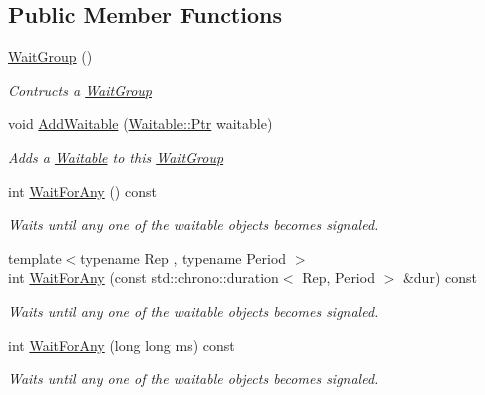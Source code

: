 \subsection*{Public Member Functions}
\begin{DoxyCompactItemize}
\item 
\mbox{\hyperlink{class_command_lib_1_1_wait_group_a813fba9c0d92994c177eee9e6289dc74}{Wait\+Group}} ()
\begin{DoxyCompactList}\small\item\em Contructs a \mbox{\hyperlink{class_command_lib_1_1_wait_group}{Wait\+Group}}\end{DoxyCompactList}\item 
void \mbox{\hyperlink{class_command_lib_1_1_wait_group_a2ad37bdf4b472ad67c660ceb2a9ca0c9}{Add\+Waitable}} (\mbox{\hyperlink{class_command_lib_1_1_waitable_ac74b6b91e48220146eada76a31cf2d9b}{Waitable\+::\+Ptr}} waitable)
\begin{DoxyCompactList}\small\item\em Adds a \mbox{\hyperlink{class_command_lib_1_1_waitable}{Waitable}} to this \mbox{\hyperlink{class_command_lib_1_1_wait_group}{Wait\+Group}}\end{DoxyCompactList}\item 
int \mbox{\hyperlink{class_command_lib_1_1_wait_group_aa119ca1edda12cc5b33602801b399839}{Wait\+For\+Any}} () const
\begin{DoxyCompactList}\small\item\em Waits until any one of the waitable objects becomes signaled.\end{DoxyCompactList}\item 
{\footnotesize template$<$typename Rep , typename Period $>$ }\\int \mbox{\hyperlink{class_command_lib_1_1_wait_group_a607e5738e2ef6d34c70459954a752340}{Wait\+For\+Any}} (const std\+::chrono\+::duration$<$ Rep, Period $>$ \&dur) const
\begin{DoxyCompactList}\small\item\em Waits until any one of the waitable objects becomes signaled.\end{DoxyCompactList}\item 
int \mbox{\hyperlink{class_command_lib_1_1_wait_group_a8c31c5a9acfaf1df818d22919a976ee2}{Wait\+For\+Any}} (long long ms) const
\begin{DoxyCompactList}\small\item\em Waits until any one of the waitable objects becomes signaled.\end{DoxyCompactList}\item 

\end{DoxyCompactItemize}
